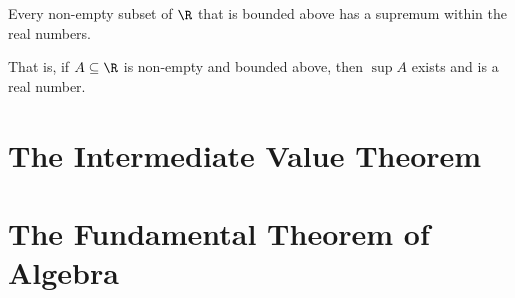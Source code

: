 \begin{axiom}[Completeness]
    Every non-empty subset of $\R$ that is bounded above has a supremum within the real numbers.

    That is, if $A \subseteq \R$ is non-empty and bounded above, then $\sup A$ exists and is a real number.
\end{axiom}

\section{The Intermediate Value Theorem}

\section{The Fundamental Theorem of Algebra}
